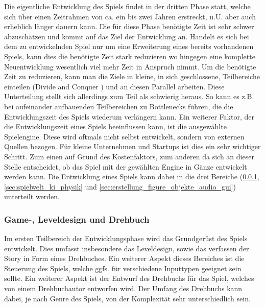 Die eigentliche Entwicklung des Spiels findet in der dritten Phase statt, welche sich über einen Zeitrahmen von ca. ein bis zwei Jahren erstreckt, u.U. aber auch erheblich länger dauern kann. Die für diese Phase benötigte Zeit ist sehr schwer abzuschätzen und kommt auf das Ziel der Entwicklung an. Handelt es sich bei dem zu entwickelnden Spiel nur um eine Erweiterung eines bereits vorhandenen Spiels, kann dies die benötigte Zeit stark reduzieren wo hingegen eine komplette Neuentwicklung wesentlich viel mehr Zeit in Anspruch nimmt. 
Um die benötigte Zeit zu reduzieren, kann man die Ziele in kleine, in sich geschlossene, Teilbereiche einteilen (Divide and Conquer \cite{Choo:2002ty}) und an diesen Parallel arbeiten. Diese Unterteilung stellt sich allerdings zum Teil als schwierig heraus. So kann es z.B. bei aufeinander aufbauenden Teilbereichen zu Bottlenecks führen, die die Entwicklungszeit des Spiels wiederum verlängern kann. 
Ein weiterer Faktor, der die Entwicklungszeit eines Spiels beeinflussen kann, ist die ausgewählte Spielengine. Diese wird oftmals nicht selbst entwickelt, sondern von externen Quellen bezogen. Für kleine Unternehmen und Startups ist dies ein sehr wichtiger Schritt. Zum einen auf Grund des Kostenfaktors, zum anderen da sich an dieser Stelle entscheidet, ob das Spiel mit der gewählten Engine in Gänze entwickelt werden kann.
Die Entwicklung eines Spiels kann dabei in die drei Bereiche (\ref{sec:game_leveldesign},   \ref{sec:spielwelt_ki_physik} und  \ref{sec:erstellung_figure_objekte_audio_gui}) unterteilt werden. 

\subsubsection{Game-, Leveldesign und Drehbuch}
\label{sec:game_leveldesign}


Im ersten Teilbereich der Entwicklungsphase wird das Grundgerüst des Spiels entwickelt. Dies umfasst insbesondere das Leveldesign, sowie das verfassen der Story in Form eines Drehbuches. Ein weiterer Aspekt dieses Bereiches ist die Steuerung des Spiels, welche ggfs. für verschiedene Inputtypen geeignet sein sollte. Ein weiterer Aspekt ist der Entwurf des Drehbuchs für das Spiel, welches von einem Drehbuchautor entworfen wird. Der Umfang des Drehbuchs kann dabei, je nach Genre des Spiels, von der Komplexität sehr unterschiedlich sein.


